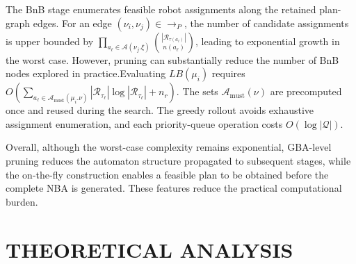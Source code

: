 \documentclass[lettersize,journal]{IEEEtran}
\theoremstyle{italiclemma}
\theoremstyle{italiclemma}
\theoremstyle{definition}
\begin{document}
The BnB stage enumerates feasible robot assignments along the retained plan-graph edges. For an edge $(\nu_i,\nu_j)\in \rightarrow_P$, the number of candidate assignments is upper bounded by $\prod_{a_\ell\in\mathcal A(\nu_j.\xi)}
\binom{|\mathcal R_{\tau(a_\ell)}|}{n(a_\ell)}$, leading to exponential growth in the worst case. However, pruning can substantially reduce the number of BnB nodes explored in practice.Evaluating $LB(\mu_i)$ requires $O(\sum_{a_\ell\in\mathcal A_{\mathrm{must}}(\mu_i.\nu)}|\mathcal R_{\tau_\ell}|\log|\mathcal R_{\tau_\ell}|+n_r)$. The sets $\mathcal A_{\mathrm{must}}(\nu)$ are precomputed once and reused during the search. The greedy rollout avoids exhaustive assignment enumeration, and each priority-queue operation costs $O(\log|\mathcal Q|)$.

Overall, although the worst-case complexity remains exponential, GBA-level pruning reduces the automaton structure propagated to subsequent stages, while the on-the-fly construction enables a feasible plan to be obtained before the complete NBA is generated. These
features reduce the practical computational burden.




\section{THEORETICAL ANALYSIS}
\label{sec:theoretical_analysis}
\end{document}
